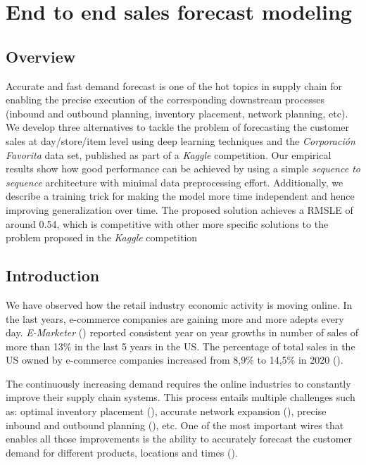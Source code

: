 \chapter{End to end sales forecast modeling}
		
\section{Overview}
Accurate and fast demand forecast is one of the hot topics in supply chain for enabling the precise execution of the corresponding downstream processes (inbound and outbound planning, inventory placement, network planning, etc). We develop three alternatives to tackle the problem of forecasting the customer sales at day/store/item level using deep learning techniques and the \textit{Corporación Favorita} data set, published as part of a \textit{Kaggle} competition. Our empirical results show how good performance can be achieved by using a simple \textit{sequence to sequence} architecture with minimal data preprocessing effort. Additionally, we describe a training trick for making the model more time independent and hence improving generalization over time. The proposed solution achieves a RMSLE of around 0.54, which is competitive with other more specific solutions to the problem proposed in the \textit{Kaggle} competition


\section{Introduction}
We have observed how the retail industry economic activity is moving online. In the last years, e-commerce companies are gaining more and more adepts every day. \textit{E-Marketer} (\cite{emarketer2019, emarketer2020}) reported consistent year on year growths in number of sales of more than 13\% in the last 5 years in the US. The percentage of total sales in the US owned by e-commerce companies increased from 8,9\% to 14,5\% in 2020 (\cite{emarketer2019, emarketer2020}).

The continuously increasing demand requires the online industries to constantly improve their supply chain systems. This process entails multiple challenges such as: optimal inventory placement (\cite{graves2008}), accurate network expansion (\cite{hossein2017}), precise inbound and outbound planning (\cite{kaipia2009}), etc. One of the most important wires that enables all those improvements is the ability to accurately forecast the customer demand for different products, locations and times (\cite{forslund2007}).  

